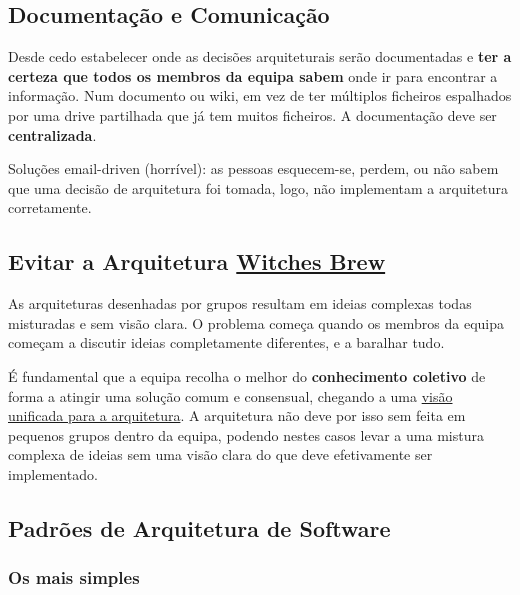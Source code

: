 \documentclass{article}
\begin{document}
\subsection{Documentação e Comunicação}

Desde cedo estabelecer onde as decisões arquiteturais serão documentadas
e \textbf{ter a certeza que todos os membros da equipa sabem} onde
ir para encontrar a informação. Num documento ou wiki, em vez de ter
múltiplos ficheiros espalhados por uma drive partilhada que já tem
muitos ficheiros. A documentação deve ser \textbf{centralizada}.

\vspace{2mm}

Soluções email-driven (horrível): as pessoas esquecem-se, perdem,
ou não sabem que uma decisão de arquitetura foi tomada, logo, não implementam
a arquitetura corretamente.

\pagebreak

\subsection{Evitar a Arquitetura \uline{Witches Brew}}

As arquiteturas desenhadas por grupos resultam em ideias complexas
todas misturadas e sem visão clara. O problema começa quando
os membros da equipa começam a discutir ideias completamente
diferentes, e a baralhar tudo.

\vspace{2mm}

É fundamental que a equipa recolha o melhor do \textbf{conhecimento coletivo} de forma a atingir uma
solução comum e consensual, chegando a uma \uline{visão unificada
para a arquitetura}. A arquitetura não deve por isso sem feita em pequenos grupos
dentro da equipa, podendo nestes casos levar a uma mistura complexa de ideias sem uma
visão clara do que deve efetivamente ser implementado.


\subsection{Padrões de Arquitetura de Software}

\subsubsection{Os mais simples}
\end{document}
